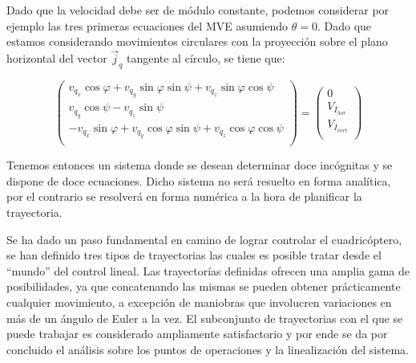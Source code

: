 \documentclass[main]{subfiles}
\begin{document}
Dado que la velocidad debe ser de m\'odulo constante, podemos considerar por ejemplo las tres primeras ecuaciones del MVE asumiendo $\theta=0$. Dado que estamos considerando movimientos circulares con la proyecci\'on sobre el plano horizontal del vector $\vec{j}_q$ tangente al c\'irculo, se tiene que:

\begin{equation}
\left(\begin{array}{c}
v_{q_x}\cos\varphi+v_{q_y}\sin\varphi\sin\psi+v_{q_z}\sin\varphi\cos\psi\\
v_{q_y}\cos\psi-v_{q_z}\sin\psi\\
-v_{q_x}\sin\varphi+v_{q_y}\cos\varphi\sin\psi+v_{q_z}\cos\varphi\cos\psi\\
\end{array}\right)=\left(\begin{array}{c}
0\\
V_{I_{hor}}\\
V_{I_{vert}}\\
\end{array}\right)
\end{equation}

Tenemos entonces un sistema donde se desean determinar doce inc\'ognitas y se dispone de doce ecuaciones. Dicho sistema no ser\'a resuelto en forma anal\'itica, por el contrario se resolver\'a en forma num\'erica a la hora de planificar la trayectoria. 




Se ha dado un paso fundamental en camino de lograr controlar el cuadric\'optero, se han definido tres tipos de trayectorias las cuales es posible tratar desde el ``mundo'' del control lineal. Las trayector\'ias definidas ofrecen una amplia gama de posibilidades, ya que concatenando las mismas se pueden obtener pr\'acticamente cualquier movimiento, a excepci\'on de maniobras que involucren variaciones en m\'as de un \'angulo de Euler a la vez. El subconjunto de trayectorias con el que se puede trabajar es considerado ampliamente satisfactorio y por ende se da por concluido el an\'alisis sobre los puntos de operaciones y la linealizaci\'on del sistema. 
\end{document}
